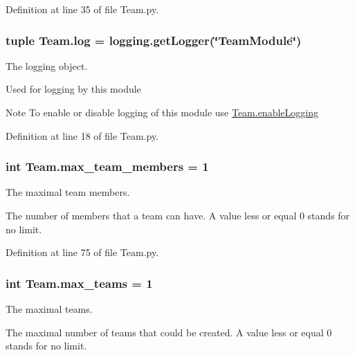 Definition at line 35 of file Team.py.

\hypertarget{namespace_team_aeda58b8cc54d371e3187f3c9af31f8cf}{
\subsubsection[{log}]{\setlength{\rightskip}{0pt plus 5cm}tuple {\bf Team.log} = logging.getLogger(\char`\"{}TeamModule\char`\"{})}}
\label{namespace_team_aeda58b8cc54d371e3187f3c9af31f8cf}


The logging object. 

Used for logging by this module \begin{DoxyNote}{Note}
To enable or disable logging of this module use \hyperlink{namespace_team_a391de1d02502546ec5d88de1632b3bc2}{Team.enableLogging} 
\end{DoxyNote}


Definition at line 18 of file Team.py.

\hypertarget{namespace_team_adf6b13168904a599042d6b67dd5e773b}{
\subsubsection[{max\_\-team\_\-members}]{\setlength{\rightskip}{0pt plus 5cm}int {\bf Team.max\_\-team\_\-members} = 1}}
\label{namespace_team_adf6b13168904a599042d6b67dd5e773b}


The maximal team members. 

The number of members that a team can have. A value less or equal 0 stands for no limit. 

Definition at line 75 of file Team.py.

\hypertarget{namespace_team_aea621f4ad9dbc98e75632e31f37c4ea4}{
\subsubsection[{max\_\-teams}]{\setlength{\rightskip}{0pt plus 5cm}int {\bf Team.max\_\-teams} = 1}}
\label{namespace_team_aea621f4ad9dbc98e75632e31f37c4ea4}


The maximal teams. 

The maximal number of teams that could be created. A value less or equal 0 stands for no limit. 

